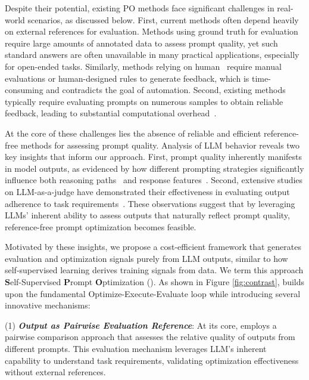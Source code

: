 Despite their potential, existing PO methods face significant challenges in real-world scenarios, as discussed below. First, current methods often depend heavily on external references for evaluation. Methods using ground truth for evaluation~\cite{yang2023opro, chris2024pb, mert2024textgrad,reid2023protegi} require large amounts of annotated data to assess prompt quality, yet such standard answers are often unavailable in many practical applications, especially for open-ended tasks. Similarly, methods relying on human~\cite{yong2024promst, lin2024apohf} require manual evaluations or human-designed rules to generate feedback, which is time-consuming and contradicts the goal of automation.
Second, existing methods typically require evaluating prompts on numerous samples to obtain reliable feedback, leading to substantial computational overhead~\cite{xin2024pa, chris2024pb}.


At the core of these challenges lies the absence of reliable and efficient reference-free methods for assessing prompt quality. Analysis of LLM behavior reveals two key insights that inform our approach. First, prompt quality inherently manifests in model outputs, as evidenced by how different prompting strategies significantly influence both reasoning paths~\cite{wei2022COT, deng2023rephrase} and response features~\cite{lei2024character, schmidgall2025agentlaboratory}. Second, extensive studies on LLM-as-a-judge have demonstrated their effectiveness in evaluating output adherence to task requirements~\cite{lianmin2023mtbench, dawei2024laajsurvey}. These observations suggest that by leveraging LLMs' inherent ability to assess outputs that naturally reflect prompt quality, reference-free prompt optimization becomes feasible.



Motivated by these insights, we propose a cost-efficient framework that generates evaluation and optimization signals purely from LLM outputs, similar to how self-supervised learning derives training signals from data. We term this approach \textbf{S}elf-Supervised \textbf{P}rompt \textbf{O}ptimization (\ours). As shown in Figure \ref{fig:contrast}, \ours builds upon the fundamental Optimize-Execute-Evaluate loop while introducing several innovative mechanisms: 

(1) \textbf{\textit{Output as Pairwise Evaluation Reference}}: At its core, \ours employs a pairwise comparison approach that assesses the relative quality of outputs from different prompts. This evaluation mechanism leverages LLM's inherent capability to understand task requirements, validating optimization effectiveness without external references.

